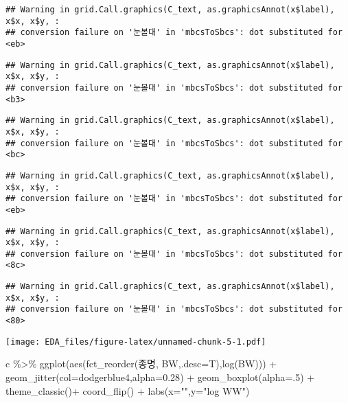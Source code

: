 \documentclass[
]{article}
\newenvironment{Shaded}{\begin{snugshade}}{\end{snugshade}}
\newcommand{\AttributeTok}[1]{\textcolor[rgb]{0.77,0.63,0.00}{#1}}
\newcommand{\DecValTok}[1]{\textcolor[rgb]{0.00,0.00,0.81}{#1}}
\newcommand{\FloatTok}[1]{\textcolor[rgb]{0.00,0.00,0.81}{#1}}
\newcommand{\FunctionTok}[1]{\textcolor[rgb]{0.00,0.00,0.00}{#1}}
\newcommand{\NormalTok}[1]{#1}
\newcommand{\SpecialCharTok}[1]{\textcolor[rgb]{0.00,0.00,0.00}{#1}}
\newcommand{\StringTok}[1]{\textcolor[rgb]{0.31,0.60,0.02}{#1}}
\begin{document}
\begin{verbatim}
## Warning in grid.Call.graphics(C_text, as.graphicsAnnot(x$label), x$x, x$y, :
## conversion failure on '눈볼대' in 'mbcsToSbcs': dot substituted for <eb>
\end{verbatim}

\begin{verbatim}
## Warning in grid.Call.graphics(C_text, as.graphicsAnnot(x$label), x$x, x$y, :
## conversion failure on '눈볼대' in 'mbcsToSbcs': dot substituted for <b3>
\end{verbatim}

\begin{verbatim}
## Warning in grid.Call.graphics(C_text, as.graphicsAnnot(x$label), x$x, x$y, :
## conversion failure on '눈볼대' in 'mbcsToSbcs': dot substituted for <bc>
\end{verbatim}

\begin{verbatim}
## Warning in grid.Call.graphics(C_text, as.graphicsAnnot(x$label), x$x, x$y, :
## conversion failure on '눈볼대' in 'mbcsToSbcs': dot substituted for <eb>
\end{verbatim}

\begin{verbatim}
## Warning in grid.Call.graphics(C_text, as.graphicsAnnot(x$label), x$x, x$y, :
## conversion failure on '눈볼대' in 'mbcsToSbcs': dot substituted for <8c>
\end{verbatim}

\begin{verbatim}
## Warning in grid.Call.graphics(C_text, as.graphicsAnnot(x$label), x$x, x$y, :
## conversion failure on '눈볼대' in 'mbcsToSbcs': dot substituted for <80>
\end{verbatim}

\texttt{[image: EDA\_files/figure-latex/unnamed-chunk-5-1.pdf]}

\begin{Shaded}
\begin{Highlighting}[]
\NormalTok{c }\SpecialCharTok{\%\textgreater{}\%} \FunctionTok{ggplot}\NormalTok{(}\FunctionTok{aes}\NormalTok{(}\FunctionTok{fct\_reorder}\NormalTok{(종명, BW,}\AttributeTok{.desc=}\NormalTok{T),}\FunctionTok{log}\NormalTok{(BW))) }\SpecialCharTok{+} \FunctionTok{geom\_jitter}\NormalTok{(}\AttributeTok{col=}\StringTok{\textquotesingle{}dodgerblue4\textquotesingle{}}\NormalTok{,}\AttributeTok{alpha=}\FloatTok{0.28}\NormalTok{) }\SpecialCharTok{+} \FunctionTok{geom\_boxplot}\NormalTok{(}\AttributeTok{alpha=}\NormalTok{.}\DecValTok{5}\NormalTok{) }\SpecialCharTok{+} \FunctionTok{theme\_classic}\NormalTok{()}\SpecialCharTok{+} \FunctionTok{coord\_flip}\NormalTok{() }\SpecialCharTok{+} \FunctionTok{labs}\NormalTok{(}\AttributeTok{x=}\StringTok{""}\NormalTok{,}\AttributeTok{y=}\StringTok{"log WW"}\NormalTok{)}
\end{Highlighting}
\end{Shaded}
\end{document}
